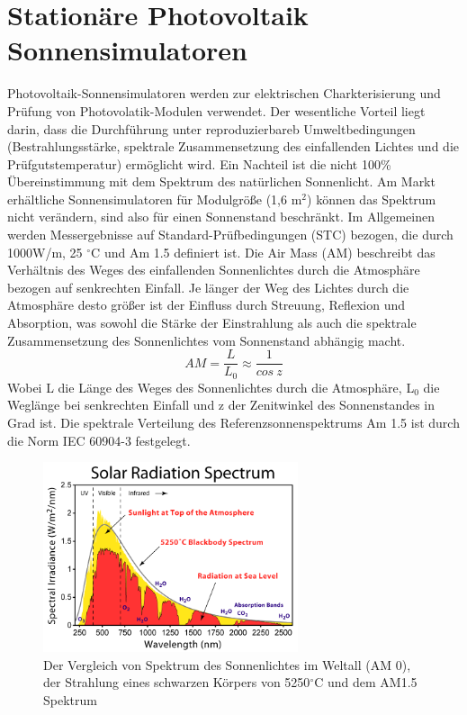 \documentclass[a4paper,bibtotoc,oneside]{scrbook}
\begin{document}
\section{Stationäre Photovoltaik Sonnensimulatoren} \thispagestyle{empty}

Photovoltaik-Sonnensimulatoren werden zur elektrischen Charkterisierung und Prüfung von Photovolatik-Modulen verwendet. Der wesentliche Vorteil liegt darin, dass die Durchführung unter reproduzierbareb Umweltbedingungen (Bestrahlungsstärke, spektrale Zusammensetzung des einfallenden Lichtes und die Prüfgutstemperatur)  ermöglicht wird. Ein Nachteil ist die nicht 100\% Übereinstimmung mit dem Spektrum des natürlichen Sonnenlicht. Am Markt erhältliche Sonnensimulatoren für Modulgröße (1,6 m$^2$) können das Spektrum nicht verändern, sind also für einen Sonnenstand beschränkt.
Im Allgemeinen werden Messergebnisse auf Standard-Prüfbedingungen (STC) bezogen, die durch 1000W/m, 25 $^{\circ}$C und Am 1.5 definiert ist. Die Air Mass (AM) beschreibt das Verhältnis des Weges des einfallenden Sonnenlichtes durch die Atmosphäre bezogen auf senkrechten Einfall. Je länger der Weg des Lichtes durch die Atmosphäre desto größer ist der Einfluss durch Streuung, Reflexion und Absorption, was sowohl die Stärke der Einstrahlung als auch die spektrale Zusammensetzung des Sonnenlichtes vom Sonnenstand abhängig macht.  \begin{equation}
     AM = \frac {L} {L_0} \approx \frac{1}{cos~ z}
  \end{equation}
Wobei L die Länge des Weges des Sonnenlichtes durch die Atmosphäre, L$_0$ die Weglänge bei senkrechten Einfall und z der Zenitwinkel des Sonnenstandes in Grad ist.
Die spektrale Verteilung des Referenzsonnenspektrums Am 1.5 ist durch die Norm IEC 60904-3 festgelegt.
 

\begin{figure}[htbp]
\centering
\includegraphics[width=75mm]{img/Solar_Spectrum.png}
\caption[Sonnenspektrum]{Der Vergleich von Spektrum des Sonnenlichtes im Weltall (AM 0), der Strahlung eines schwarzen Körpers von 5250$^{\circ}$C und dem AM1.5 Spektrum}\label{sunspec}
\end{figure}
\end{document}

